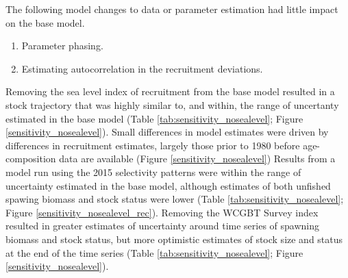 \documentclass[11pt,
  english,
  a4paper,
]{article}
\begin{document}
\leavevmode\tagmcend\tagstructend\par

The following model changes to data or parameter estimation had little impact on the base model.

\begin{enumerate}
\item Parameter phasing.
\item Estimating autocorrelation in the recruitment deviations.
\end{enumerate}


Removing the sea level index of recruitment from the base model resulted in a stock trajectory that was highly similar to, and within, the range of uncertanty estimated in the base model (Table \ref{tab:sensitivity_nosealevel}; Figure \ref{sensitivity_nosealevel}). Small differences in model estimates were driven by differences in recruitment estimates, largely those prior to 1980 before age-composition data are available (Figure \ref{sensitivity_nosealevel}) Results from a model run using the 2015 selectivity patterns were within the range of uncertainty estimated in the base model, although estimates of both unfished spawing biomass and stock status were lower (Table \ref{tab:sensitivity_nosealevel}; Figure \ref{sensitivity_nosealevel_rec}). Removing the WCGBT Survey index resulted in greater estimates of uncertainty around time series of spawning biomass and stock status, but more optimistic estimates of stock size and status at the end of the time series (Table \ref{tab:sensitivity_nosealevel}; Figure \ref{sensitivity_nosealevel}).

\leavevmode\tagmcend\tagstructend\par

\end{document}
